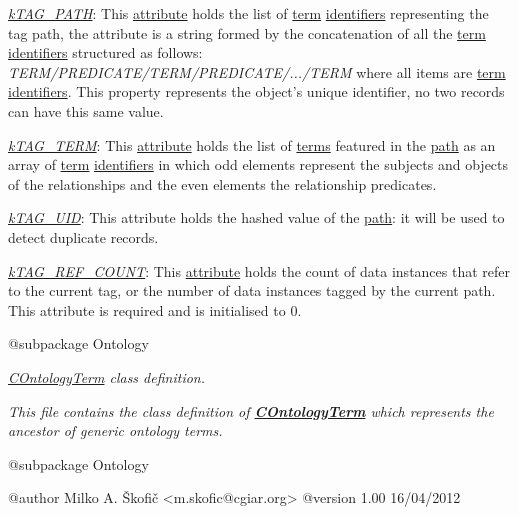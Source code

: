 {\itshape 
\begin{DoxyItemize}
\item {\itshape \hyperlink{}{k\-T\-A\-G\-\_\-\-P\-A\-T\-H}}\-: This \hyperlink{}{attribute} holds the list of \hyperlink{class_c_ontology_term}{term} \hyperlink{class_c_ontology_term_object_ab1a4d21bb56a8a6cf3f77f595d776267}{identifiers} representing the tag path, the attribute is a string formed by the concatenation of all the \hyperlink{class_c_ontology_term}{term} \hyperlink{class_c_ontology_term_object_ab1a4d21bb56a8a6cf3f77f595d776267}{identifiers} structured as follows\-: {\itshape T\-E\-R\-M/\-P\-R\-E\-D\-I\-C\-A\-T\-E/\-T\-E\-R\-M/\-P\-R\-E\-D\-I\-C\-A\-T\-E/.../\-T\-E\-R\-M} where all items are \hyperlink{class_c_ontology_term}{term} \hyperlink{class_c_ontology_term_object_ab1a4d21bb56a8a6cf3f77f595d776267}{identifiers}. This property represents the object's unique identifier, no two records can have this same value. 
\item {\itshape \hyperlink{}{k\-T\-A\-G\-\_\-\-T\-E\-R\-M}}\-: This \hyperlink{}{attribute} holds the list of \hyperlink{class_c_ontology_term}{terms} featured in the \hyperlink{}{path} as an array of \hyperlink{class_c_ontology_term}{term} \hyperlink{}{identifiers} in which odd elements represent the subjects and objects of the relationships and the even elements the relationship predicates. 
\item {\itshape \hyperlink{}{k\-T\-A\-G\-\_\-\-U\-I\-D}}\-: This attribute holds the hashed value of the \hyperlink{}{path}\-: it will be used to detect duplicate records. 
\item {\itshape \hyperlink{}{k\-T\-A\-G\-\_\-\-R\-E\-F\-\_\-\-C\-O\-U\-N\-T}}\-: This \hyperlink{}{attribute} holds the count of data instances that refer to the current tag, or the number of data instances tagged by the current path. This attribute is required and is initialised to 0. 
\end{DoxyItemize}}

{\itshape \begin{DoxyVerb} @subpackage        Ontology\end{DoxyVerb}
}

{\itshape {\itshape \hyperlink{class_c_ontology_term}{C\-Ontology\-Term}} class definition.}

{\itshape This file contains the class definition of {\bfseries \hyperlink{class_c_ontology_term}{C\-Ontology\-Term}} which represents the ancestor of generic ontology terms.}

{\itshape \begin{DoxyVerb} @subpackage        Ontology

 @author            Milko A. Škofič <m.skofic@cgiar.org>
 @version   1.00 16/04/2012\end{DoxyVerb}
}

